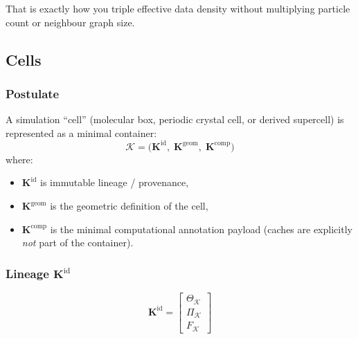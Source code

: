 \documentclass[11pt, a4paper, oneside]{article}
\theoremstyle{definition}
\theoremstyle{remark}
\newcommand{\boldK}{\mathbf{K}}
\begin{document}
\medskip
\noindent
That is exactly how you triple effective data density without
multiplying particle count or neighbour graph size.


\subsection{Cells}
\label{sec:cell-container}

\subsubsection{Postulate}
\label{sec:cell-postulate}

A simulation ``cell'' (molecular box, periodic crystal cell, or
derived supercell) is represented as a minimal container:
%
\begin{equation}
  \mathcal{K} =
  \bigl(
    \boldK^{\mathrm{id}},\;
    \boldK^{\mathrm{geom}},\;
    \boldK^{\mathrm{comp}}
  \bigr)
  \label{eq:cell-container}
\end{equation}
%
where:
\begin{itemize}
  \item $\boldK^{\mathrm{id}}$ is immutable lineage / provenance,
  \item $\boldK^{\mathrm{geom}}$ is the geometric definition of the cell,
  \item $\boldK^{\mathrm{comp}}$ is the minimal computational annotation
        payload (caches are explicitly \emph{not} part of the container).
\end{itemize}

\subsubsection{Lineage \texorpdfstring{$\boldK^{\mathrm{id}}$}{Kid}}
\label{sec:cell-identity}

\begin{equation}
  \boldK^{\mathrm{id}} =
  \begin{bmatrix}
    \Theta_{\mathcal{K}} \\[3pt]
    \Pi_{\mathcal{K}} \\[3pt]
    F_{\mathcal{K}}
  \end{bmatrix}
  \label{eq:cell-identity}
\end{equation}
\end{document}
